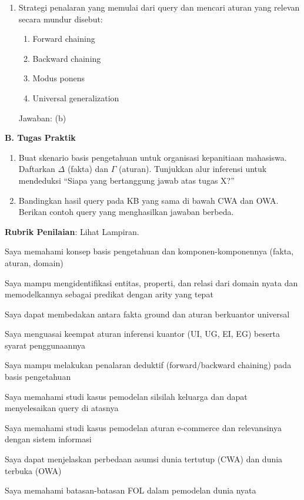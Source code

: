 \documentclass[../main]{subfiles}
\begin{document}
\begin{asesmen}
\begin{enumerate}
  \item Strategi penalaran yang memulai dari query dan mencari aturan yang relevan secara mundur disebut:
  \begin{enumerate}
    \item Forward chaining
    \item Backward chaining
    \item Modus ponens
    \item Universal generalization
  \end{enumerate}
  Jawaban: (b)
\end{enumerate}

\textbf{B. Tugas Praktik}
\begin{enumerate}
  \item Buat skenario basis pengetahuan untuk organisasi kepanitiaan mahasiswa. Daftarkan $\Delta$ (fakta) dan $\Gamma$ (aturan). Tunjukkan alur inferensi untuk mendeduksi ``Siapa yang bertanggung jawab atas tugas X?''
  \item Bandingkan hasil query pada KB yang sama di bawah CWA dan OWA. Berikan contoh query yang menghasilkan jawaban berbeda.
\end{enumerate}

\textbf{Rubrik Penilaian}: Lihat Lampiran.
\end{asesmen}


\begin{checklist}
  \item Saya memahami konsep basis pengetahuan dan komponen-komponennya (fakta, aturan, domain)
  \item Saya mampu mengidentifikasi entitas, properti, dan relasi dari domain nyata dan memodelkannya sebagai predikat dengan arity yang tepat
  \item Saya dapat membedakan antara fakta ground dan aturan berkuantor universal
  \item Saya menguasai keempat aturan inferensi kuantor (UI, UG, EI, EG) beserta syarat penggunaannya
  \item Saya mampu melakukan penalaran deduktif (forward/backward chaining) pada basis pengetahuan
  \item Saya memahami studi kasus pemodelan silsilah keluarga dan dapat menyelesaikan query di atasnya
  \item Saya memahami studi kasus pemodelan aturan e-commerce dan relevansinya dengan sistem informasi
  \item Saya dapat menjelaskan perbedaan asumsi dunia tertutup (CWA) dan dunia terbuka (OWA)
  \item Saya memahami batasan-batasan FOL dalam pemodelan dunia nyata
\end{checklist}
\end{document}
